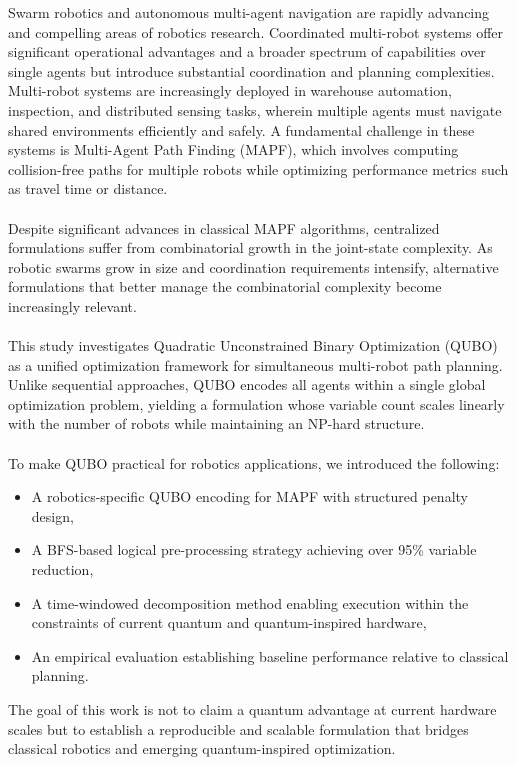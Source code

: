 \documentclass[11pt]{article}
\begin{document}
Swarm robotics and autonomous multi-agent navigation are rapidly advancing and compelling areas of robotics research. Coordinated multi-robot systems offer significant operational advantages and a broader spectrum of capabilities over single agents but introduce substantial coordination and planning complexities. Multi-robot systems are increasingly deployed in warehouse automation, inspection, and distributed sensing tasks, wherein multiple agents must navigate shared environments efficiently and safely. A fundamental challenge in these systems is Multi-Agent Path Finding (MAPF), which involves computing collision-free paths for multiple robots while optimizing performance metrics such as travel time or distance.\\
\\
Despite significant advances in classical MAPF algorithms, centralized formulations suffer from combinatorial growth in the joint-state complexity. As robotic swarms grow in size and coordination requirements intensify, alternative formulations that better manage the combinatorial complexity become increasingly relevant.\\
\\
This study investigates Quadratic Unconstrained Binary Optimization (QUBO) as a unified optimization framework for simultaneous multi-robot path planning. Unlike sequential approaches, QUBO encodes all agents within a single global optimization problem, yielding a formulation whose variable count scales linearly with the number of robots while maintaining an NP-hard structure.\\
\\
To make QUBO practical for robotics applications, we introduced the following:

\begin{itemize}

\item A robotics-specific QUBO encoding for MAPF with structured penalty design,
\item A BFS-based logical pre-processing strategy achieving over 95\% variable reduction,
\item A time-windowed decomposition method enabling execution within the constraints of current quantum and quantum-inspired hardware,
\item An empirical evaluation establishing baseline performance relative to classical planning.

\end{itemize}

The goal of this work is not to claim a quantum advantage at current hardware scales but to establish a reproducible and scalable formulation that bridges classical robotics and emerging quantum-inspired optimization.
\end{document}
